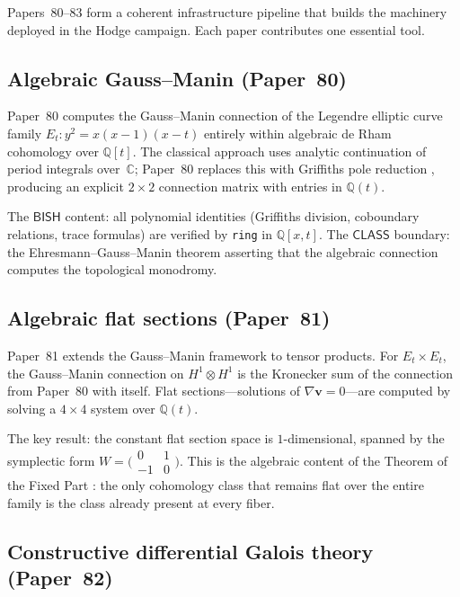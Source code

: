 \documentclass[11pt]{article}
\theoremstyle{plain}
\theoremstyle{definition}
\theoremstyle{remark}
\newcommand{\QQ}{\mathbb{Q}}
\newcommand{\CC}{\mathbb{C}}
\newcommand{\BISH}{\mathsf{BISH}}
\newcommand{\CLASS}{\mathsf{CLASS}}
\begin{document}
Papers~80--83 form a coherent infrastructure pipeline that builds
the machinery deployed in the Hodge campaign.  Each paper contributes
one essential tool.

\subsection{Algebraic Gauss--Manin (Paper~80)}

Paper~80 \cite{p80} computes the Gauss--Manin connection of the
Legendre elliptic curve family $E_t: y^2 = x(x-1)(x-t)$ entirely
within algebraic de Rham cohomology over $\QQ[t]$.  The classical
approach uses analytic continuation of period integrals over~$\CC$;
Paper~80 replaces this with Griffiths pole reduction
\cite{griffiths-periods}, producing an explicit $2 \times 2$
connection matrix with entries in $\QQ(t)$.

The $\BISH$ content: all polynomial identities (Griffiths division,
coboundary relations, trace formulas) are verified by \texttt{ring}
in $\QQ[x,t]$.  The $\CLASS$ boundary: the Ehresmann--Gauss--Manin
theorem asserting that the algebraic connection computes the
topological monodromy.

\subsection{Algebraic flat sections (Paper~81)}

Paper~81 \cite{p81} extends the Gauss--Manin framework to tensor
products.  For $E_t \times E_t$, the Gauss--Manin connection on
$H^1 \otimes H^1$ is the Kronecker sum of the connection from
Paper~80 with itself.  Flat sections---solutions of
$\nabla \mathbf{v} = 0$---are computed by solving a $4 \times 4$
system over $\QQ(t)$.

The key result: the constant flat section space is $1$-dimensional,
spanned by the symplectic form $W = \bigl(\begin{smallmatrix}
0 & 1 \\ -1 & 0 \end{smallmatrix}\bigr)$.  This is the algebraic
content of the Theorem of the Fixed Part \cite{deligne-hodge-II}:
the only cohomology class that remains flat over the entire family
is the class already present at every fiber.

\subsection{Constructive differential Galois theory (Paper~82)}
\end{document}
